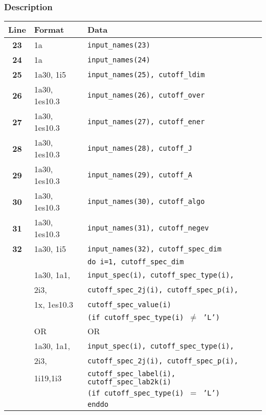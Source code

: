 \documentclass[a4paper,11pt]{article}
\begin{document}
\subsubsection*{Description}
\begin{center}
\begin{tabular}{|c|l|l|}
\hline
Line & Format & Data \\
\hline
 \textbf{23}   & 1a    & \tt input\_names(23)                          \\
 \textbf{24}   & 1a    & \tt input\_names(24)                          \\
 \textbf{25}   & 1a30, 1i5 & \tt input\_names(25), cutoff\_ldim        \\
 \textbf{26}   & 1a30, 1es10.3 & \tt input\_names(26), cutoff\_over    \\
 \textbf{27}   & 1a30, 1es10.3 & \tt input\_names(27), cutoff\_ener    \\
 \textbf{28}   & 1a30, 1es10.3 & \tt input\_names(28), cutoff\_J       \\
 \textbf{29}   & 1a30, 1es10.3 & \tt input\_names(29), cutoff\_A       \\
 \textbf{30}   & 1a30, 1es10.3 & \tt input\_names(30), cutoff\_algo    \\
 \textbf{31}   & 1a30, 1es10.3 & \tt input\_names(31), cutoff\_negev   \\
 \textbf{32}   & 1a30, 1i5 & \tt input\_names(32), cutoff\_spec\_dim   \\
               &           & \tt do i=1, cutoff\_spec\_dim           \\
 \textbf{  }   & 1a30, 1a1,  & \:\: \tt input\_spec(i), cutoff\_spec\_type(i),   \\
 \textbf{  }   & 2i3,        & \:\: \tt cutoff\_spec\_2j(i), cutoff\_spec\_p(i), \\
 \textbf{  }   & 1x, 1es10.3 & \:\: \tt cutoff\_spec\_value(i) \\
 \textbf{  }   &             & \:\: \tt (if cutoff\_spec\_type(i) $\ne$ 'L') \\
 \textbf{  }   &  OR         & \:\: OR \\
 \textbf{  }   & 1a30, 1a1,  & \:\: \tt input\_spec(i), cutoff\_spec\_type(i),   \\
 \textbf{  }   & 2i3,        & \:\: \tt cutoff\_spec\_2j(i), cutoff\_spec\_p(i), \\
 \textbf{  }   & 1i19,1i3    & \:\: \tt cutoff\_spec\_label(i), cutoff\_spec\_lab2k(i) \\
 \textbf{  }   &             & \:\: \tt (if cutoff\_spec\_type(i) $=$ 'L') \\
               &           & \tt enddo                               \\
\hline
\end{tabular}
\end{center}
\end{document}
